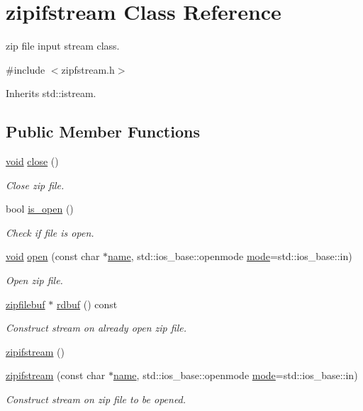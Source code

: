 \hypertarget{classzipifstream}{}\section{zipifstream Class Reference}
\label{classzipifstream}


zip file input stream class.  




{\ttfamily \#include $<$zipfstream.\+h$>$}



Inherits std\+::istream.

\subsection*{Public Member Functions}
\begin{DoxyCompactItemize}
\item 
\hyperlink{lp__lib_8h_ac7828c7b2b31d2e11af17bdb6289c5d9}{void} \hyperlink{classzipifstream_a15318cb53e9e01e6d3503d019b683113}{close} ()
\begin{DoxyCompactList}\small\item\em Close zip file. \end{DoxyCompactList}\item 
bool \hyperlink{classzipifstream_a79ad0d677fdffee47f9b1905e538a13f}{is\+\_\+open} ()
\begin{DoxyCompactList}\small\item\em Check if file is open. \end{DoxyCompactList}\item 
\hyperlink{lp__lib_8h_ac7828c7b2b31d2e11af17bdb6289c5d9}{void} \hyperlink{classzipifstream_acc6d1ce5b46679742cbaaa517a2ff1f5}{open} (const char $\ast$\hyperlink{lp__lib_8h_a2946c588fc7fa2fa5b43ac54b7872725}{name}, std\+::ios\+\_\+base\+::openmode \hyperlink{ioapi_8h_ab77191763734fbb3e515371393ccb606}{mode}=std\+::ios\+\_\+base\+::in)
\begin{DoxyCompactList}\small\item\em Open zip file. \end{DoxyCompactList}\item 
\hyperlink{classzipfilebuf}{zipfilebuf} $\ast$ \hyperlink{classzipifstream_a76e1d4362bfd964b7149c5d1b5f74726}{rdbuf} () const
\begin{DoxyCompactList}\small\item\em Construct stream on already open zip file. \end{DoxyCompactList}\item 
\hyperlink{classzipifstream_a6c70a47a8d5c13f3f5c61299a1136fa8}{zipifstream} ()
\item 
\hyperlink{classzipifstream_ab034c1ab8a0187f37f5e92a25273f497}{zipifstream} (const char $\ast$\hyperlink{lp__lib_8h_a2946c588fc7fa2fa5b43ac54b7872725}{name}, std\+::ios\+\_\+base\+::openmode \hyperlink{ioapi_8h_ab77191763734fbb3e515371393ccb606}{mode}=std\+::ios\+\_\+base\+::in)
\begin{DoxyCompactList}\small\item\em Construct stream on zip file to be opened. \end{DoxyCompactList}\end{DoxyCompactItemize}


